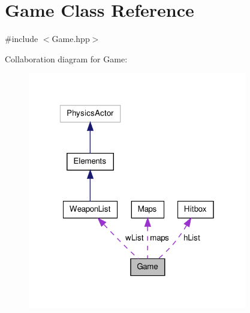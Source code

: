\hypertarget{class_game}{\section{Game Class Reference}
\label{class_game}
}


{\ttfamily \#include $<$Game.\-hpp$>$}



Collaboration diagram for Game\-:\nopagebreak
\begin{figure}[H]
\begin{center}
\leavevmode
\includegraphics[width=271pt]{class_game__coll__graph}
\end{center}
\end{figure}
